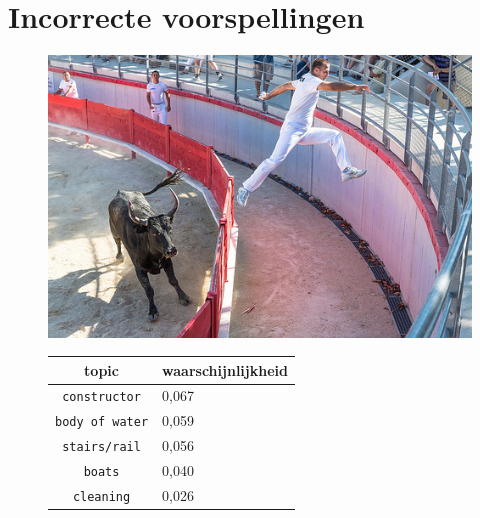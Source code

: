 \section{Incorrecte voorspellingen}
\begin{figure}[!htb]
    \centering
    \begin{minipage}[t]{.5\linewidth}
    \centering
    \vspace{0pt}
    \includegraphics[width=\textwidth]{Images/LDA/7446693604.jpg}
    \end{minipage}\hfill
    \begin{minipage}[t]{.5\textwidth}
    \centering
    \vspace{0pt}
    \begin{tabular}{cl}
            topic                           & waarschijnlijkheid\\
            \hline
            \texttt{constructor}             & 0,067 \\
            \texttt{body of water}                   & 0,059 \\
            \texttt{stairs/rail}                 & 0,056 \\
            \texttt{boats}           & 0,040 \\
            \texttt{cleaning}        & 0,026\\
            \hline
        \end{tabular}
    \end{minipage}
\end{figure}